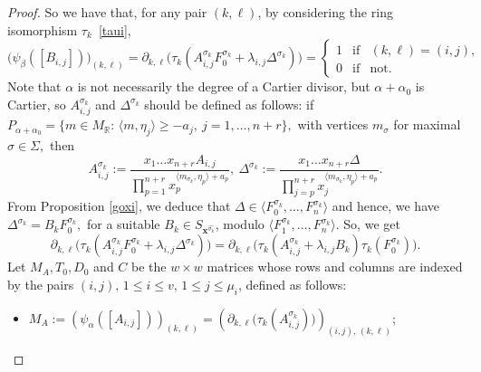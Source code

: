 \documentclass[a4paper,11pt]{amsart}
\newcommand{\R}{\mathbb{R}}
\newcommand{\bfx}{{\boldsymbol{x}}}
\numberwithin{thm}{section}
\numberwithin{equation}{section}
\theoremstyle{definition}
\theoremstyle{plain}
\begin{document}
\begin{proof}
So we have that, for any pair $(k,\ell)$, by considering the ring isomorphism $\tau_k$~\eqref{taui},
\begin{equation}\label{ozu}
\big(\psi_\beta([B_{i,j}])\big)_{(k,\ell)}=\partial_{k,\ell}\big(\tau_k(A^{\sigma_k}_{i,j}F^{\sigma_k}_0+\lambda_{i,j}\Delta^{\sigma_k})
\big)=
\left\{\begin{array}{ccc}
1 & \mbox{if} & (k,\ell) = (i,j),\\
0& \mbox{if} & \mbox{not.}
\end{array}
\right.
\end{equation}
Note that  $\alpha$ is not necessarily the degree of a Cartier divisor, but $\alpha+\alpha_0$ is Cartier, so $A^{\sigma_k}_{i,j}$ 
and $\Delta^{\sigma_k}$ should be defined as follows: if $P_{\alpha+\alpha_0}=\{m\in M_\R:\,\langle m,\eta_j\rangle\geq -a_j,\ j=
1,\ldots, n+r\},$ with vertices $m_\sigma$ for maximal $\sigma\in\Sigma,$ then 
$$A^{\sigma_k}_{i,j}:=\frac{x_1\ldots x_{n+r}A_{i,j}}{\prod_{p=1}^{n+r}x_p^{\langle m_{\sigma_k},\eta_p\rangle+a_p}}, 
\ \Delta^{\sigma_k}:=\frac{x_1\ldots x_{n+r}\Delta}{\prod_{j=p}^{n+r}x_j^{\langle m_{\sigma_k},\eta_p\rangle+a_p}}.$$
From Proposition \ref{goxi}, we deduce that $\Delta\in \langle F^{\sigma_k}_0,\ldots, F^{\sigma_k}_n\rangle$ and hence, we have $\Delta^{\sigma_k}=B_k F^{\sigma_k}_0,$ 
for a suitable $B_{k}\in S_{\bfx^{\widehat{\sigma_k}}}$,  modulo  
$\langle F^{\sigma_k}_1,\ldots, F^{\sigma_k}_n\rangle$.
So, we get
\begin{equation}\label{sale}
\partial_{k,\ell}\big(\tau_k(A^{\sigma_k}_{i,j}F^{\sigma_k}_0+ \lambda_{i,j}\Delta^{\sigma_k})
\big)=
\partial_{k,\ell}\big(\tau_k(A^{\sigma_k}_{i,j}+\lambda_{i,j}B_k)\tau_k(F^{\sigma_k}_{0})\big).
\end{equation}
Let $M_A, T_0, D_0$ and $C$ be the $w \times w$ matrices whose rows and columns are indexed by the pairs $(i,j),\, 1\leq i\leq v,\, 1\leq j\leq \mu_i$, defined as follows:
\begin{itemize}
\item 
$M_A:=\left(\psi_{\alpha}([A_{i,j}])\right)_{(k,\ell)}=\left(\partial_{k,\ell}\big(\tau_k(A^{\sigma_k}_{i,j}))\right)_{(i,j),\,(k,\ell)}$;



\end{itemize}
\end{proof}
\end{document}
